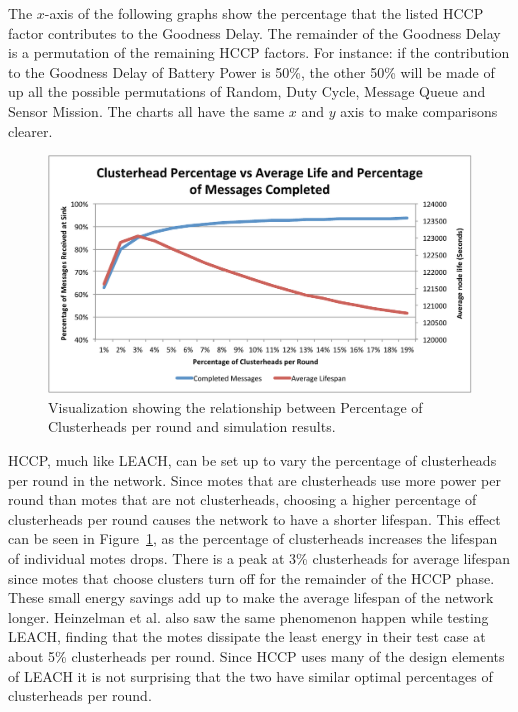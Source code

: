 The $x$-axis of the following graphs show the percentage that the listed HCCP factor contributes to the
Goodness Delay. The remainder of the Goodness Delay is a permutation of the remaining HCCP factors. For instance:
if the contribution to the Goodness Delay of Battery Power is 50\%, the other 50\% will be made of up all the 
possible permutations of Random, Duty Cycle, Message Queue and Sensor Mission. 
The charts all have the same $x$ and $y$ axis to make comparisons clearer. 


\begin{figure}[htb]
	\centering
		\includegraphics[width=6in]{images/simulation/goodness/clusterhead.pdf}
	\caption{Visualization showing the relationship between Percentage of Clusterheads per round and simulation results.}
	\label{fig:images_simulation_goodness_clusterhead}
\end{figure}


HCCP, much like LEACH, can be set up to vary the percentage of clusterheads per round in the network.
Since motes that are clusterheads use more power per round than motes that are not clusterheads, choosing
a higher percentage of clusterheads per round causes the network to have a shorter lifespan. This effect can 
be seen in Figure~\ref{fig:images_simulation_goodness_clusterhead}, as the percentage of clusterheads increases the 
lifespan of individual motes drops. There is a peak at 3\% clusterheads for average lifespan since motes that choose clusters
turn off for the remainder of the HCCP phase. These small energy savings add up to make the average lifespan of the network 
longer. Heinzelman et al.\cite{leach} also saw the same phenomenon happen while testing LEACH, finding that the motes
dissipate the least energy in their test case at about 5\% clusterheads per round. Since HCCP uses many of
the design elements of LEACH it is not surprising that the two have similar optimal percentages of clusterheads
per round. 

